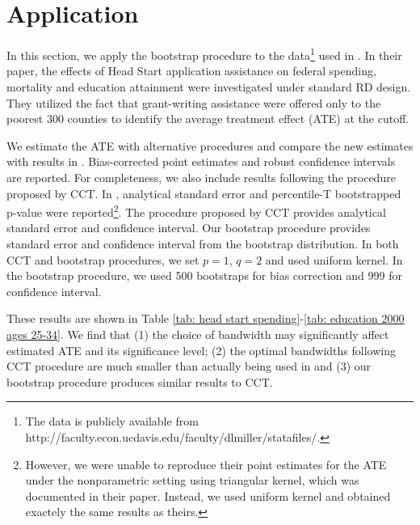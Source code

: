 \documentclass[12pt,fleqn]{article}
\begin{document}
\section{Application}\label{application}

In this section, we apply the bootstrap procedure to the data\footnote{The data is publicly available from http://faculty.econ.ucdavis.edu/faculty/dlmiller/statafiles/.} used in \cite{ludwig2007}. In their paper, the effects of Head Start application assistance on federal spending, mortality and education attainment were investigated under standard RD design. They utilized the fact that grant-writing assistance were offered only to the poorest 300 counties to identify the average treatment effect (ATE) at the cutoff.

We estimate the ATE with alternative procedures and compare the new estimates with results in \cite{ludwig2007}. Bias-corrected point estimates and robust confidence intervals are reported. For completeness, we also include results following the procedure proposed by CCT. In \cite{ludwig2007}, analytical standard error and percentile-T bootstrapped p-value were reported\footnote{However, we were unable to reproduce their point estimates for the ATE under the nonparametric setting using triangular kernel, which was documented in their paper. Instead, we used uniform kernel and obtained exactely the same results as theirs.}. The procedure proposed by CCT provides analytical standard error and confidence interval. Our bootstrap procedure provides standard error and confidence interval from the bootstrap distribution. In both CCT and bootstrap procedures, we set $p = 1$, $q = 2$ and used uniform kernel. In the bootstrap procedure, we used 500 bootstraps for bias correction and 999 for confidence interval.

These results are shown in Table \ref{tab: head start spending}-\ref{tab: education 2000 ages 25-34}. We find that (1) the choice of bandwidth may significantly affect estimated ATE and its significance level; (2) the optimal bandwidths following CCT procedure are much smaller than actually being used in \cite{ludwig2007} and (3) our bootstrap procedure produces similar results to CCT.
\end{document}
